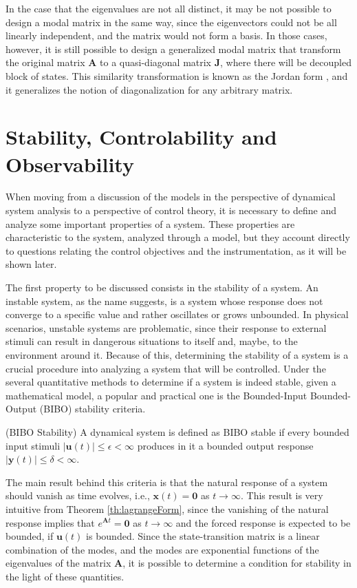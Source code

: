 \documentclass[a4paper,11pt]{book}
\numberwithin{figure}{chapter}
\numberwithin{equation}{chapter}
\numberwithin{table}{chapter}
\theoremstyle{definition}
\newtheorem{definition}{Definition}[chapter]
\newcounter{boxed-theorem}
\newcounter{boxed-definition}
\newenvironment{boxed-definition}[1]
{\colorlet{shadecolor}{pastelYellow!15} \begin{shaded} \begin{definition}{#1}}
{\end{definition} \end{shaded}}
\newcounter{boxed-example}
\begin{document}
In the case that the eigenvalues are not all distinct, it may be not possible to design a modal matrix in the same way, since the eigenvectors could not be all linearly independent, and the matrix would not form a basis. In those cases, however, it is still possible to design a generalized modal matrix that transform the original matrix $\bm{A}$ to a quasi-diagonal matrix $\bm{J}$, where there will be decoupled block of states. This similarity transformation is known as the Jordan form \cite{Strang:2016}, and it generalizes the notion of diagonalization for any arbitrary matrix.

\section{Stability, Controlability and Observability}

When moving from a discussion of the models in the perspective of dynamical system analysis to a perspective of control theory, it is necessary to define and analyze some important properties of a system. These properties are characteristic to the system, analyzed through a model, but they account directly to questions relating the control objectives and the instrumentation, as it will be shown later.

The first property to be discussed consists in the stability of a system. An instable system, as the name suggests, is a system whose response does not converge to a specific value and rather oscillates or grows unbounded. In physical scenarios, unstable systems are problematic, since their response to external stimuli can result in dangerous situations to itself and, maybe, to the environment around it. Because of this, determining the stability of a system is a crucial procedure into analyzing a system that will be controlled. Under the several quantitative methods to determine if a system is indeed stable, given a mathematical model, a popular and practical one is the Bounded-Input Bounded-Output (BIBO) stability criteria.

\begin{boxed-definition}{(BIBO Stability)} \label{def:BIBOStab}
    A dynamical system is defined as BIBO stable if every bounded input stimuli $| \bm{u}(t) | \leq \epsilon < \infty$ produces in it a bounded output response $| \bm{y}(t) | \leq \delta < \infty$.
\end{boxed-definition}

The main result behind this criteria is that the natural response of a system should vanish as time evolves, i.e., $\bm{x}(t) = \bm{0}$ as $t \to \infty$. This result is very intuitive from Theorem \ref{th:lagrangeForm}, since the vanishing of the natural response implies that $e^{\bm{A} t} = \bm{0}$ as $t \to \infty$ and the forced response is expected to be bounded, if $\bm{u}(t)$ is bounded. Since the state-transition matrix is a linear combination of the modes, and the modes are exponential functions of the eigenvalues of the matrix $\bm{A}$, it is possible to determine a condition for stability in the light of these quantities.
\end{document}

